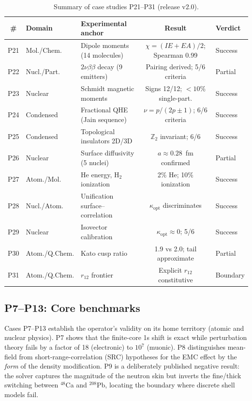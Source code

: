 \documentclass[11pt,a4paper]{article}
\begin{document}
\begin{table}[htbp]
\centering
\caption{Summary of case studies P21--P31 (release v2.0).}
\label{tab:summary2}
\begin{tabular}{@{}cllcl@{}}
\toprule
\# & Domain & Experimental anchor & Result & Verdict \\
\midrule
P21 & Mol./Chem.   & Dipole moments (14 molecules)           & $\chi=(IE+EA)/2$; Spearman 0.99 & Success \\
P22 & Nucl./Part.  & $2\nu\beta\beta$ decay (9 emitters)     & Pairing derived; 5/6 criteria     & Partial \\
P23 & Nuclear      & Schmidt magnetic moments                & Signs 12/12; $<10\%$ single-part. & Success \\
P24 & Condensed    & Fractional QHE (Jain sequence)          & $\nu=p/(2p\pm1)$; 6/6 criteria   & Success \\
P25 & Condensed    & Topological insulators 2D/3D            & $\mathbb{Z}_2$ invariant; 6/6     & Success \\
P26 & Nuclear      & Surface diffusivity (5 nuclei)          & $a\approx0.28$~fm confirmed      & Partial \\
P27 & Atom./Mol.   & He energy, H$_2$ ionization             & 2\% He; 10\% ionization           & Success \\
P28 & Nucl./Atom.  & Unification surface--correlation        & $\kappa_{\text{opt}}$ discriminates & Success \\
P29 & Nuclear      & Isovector calibration                   & $\kappa_{\text{opt}}\approx0$; 5/6 & Success \\
P30 & Atom./Q.Chem.& Kato cusp ratio                         & 1.9 vs 2.0; tail approximate     & Partial \\
P31 & Atom./Q.Chem.& $r_{12}$ frontier                       & Explicit $r_{12}$ constitutive   & Boundary \\
\bottomrule
\end{tabular}
\end{table}

\subsection{P7--P13: Core benchmarks}
Cases P7--P13 establish the operator's validity on its home territory (atomic and nuclear physics). P7 shows that the finite-core 1s shift is exact while perturbation theory fails by a factor of 18 (electronic) to $10^7$ (muonic). P8 distinguishes mean-field from short-range-correlation (SRC) hypotheses for the EMC effect by the \emph{form} of the density modification. P9 is a deliberately published negative result: the solver captures the magnitude of the neutron skin but inverts the fine/thick switching between $^{48}$Ca and $^{208}$Pb, locating the boundary where discrete shell models fail.
\end{document}
